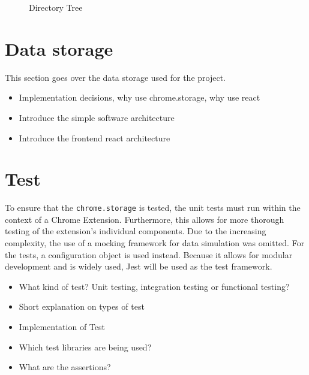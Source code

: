 \begin{figure}[ht!]
  \caption{Directory Tree}
  \label{directory_tree}
\end{figure}

\section{Data storage}
This section goes over the data storage used for the project.


\begin{itemize}
  \item Implementation decisions, why use chrome.storage, why use react
  \item Introduce the simple software architecture
  \item Introduce the frontend react architecture
\end{itemize}

\section{Test}
To ensure that the \verb;chrome.storage; is tested, the unit tests must run within the context of a Chrome Extension. Furthermore, this allows for more thorough testing of the extension's individual components. Due to the increasing complexity, the use of a mocking framework for data simulation was omitted. For the tests, a configuration object is used instead. Because it allows for modular development and is widely used, Jest will be used as the test framework.
\begin{itemize}
  \item What kind of test? Unit testing, integration testing or functional testing?
  \item Short explanation on types of test
  \item Implementation of Test
  \item Which test libraries are being used?
  \item What are the assertions?
\end{itemize}

